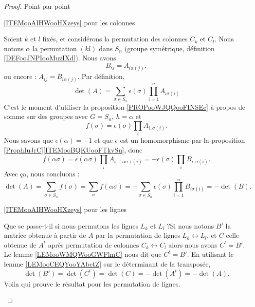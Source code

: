 \begin{proof}
    Point par point
    \begin{subproof}
    \item[\ref{ITEMooAIHWooHXzeys} pour les colonnes]

    Soient \( k\) et \( l\) fixés, et considérons la permutation des colonnes \( C_k\) et \( C_l\). Nous notons \( \alpha\) la permutation \( (kl)\) dans \( S_n\) (groupe symétrique, définition \ref{DEFooJNPIooMuzIXd}). Nous avons
    \begin{equation}
        B_{ij}=A_{i \alpha(j)},
    \end{equation}
    ou encore : \( A_{ij}=B_{i\alpha(j)}\). Par définition,
    \begin{equation}
        \det(A)=\sum_{\sigma\in S_{n}}\epsilon(\sigma)\prod_{i=1}^nA_{i\sigma(i)}
    \end{equation}
    C'est le moment d'utiliser la proposition \ref{PROPooWJQQooFINSEc} à propos de somme sur des groupes avec \( G=S_n\), \( h=\alpha\) et 
    \begin{equation}
        f(\sigma)=\epsilon(\sigma)\prod_iA_{i,\sigma(i)}.
    \end{equation}
    Nous savons que \( \epsilon(\alpha)=-1\) et que \( \epsilon\) est un homomorphisme par la proposition \ref{ProphIuJrC}\ref{ITEMooBQKUooFTkvSu}, donc
    \begin{equation}
        f(\alpha \sigma)=\epsilon(\alpha\sigma)\prod_iA_{i,(\alpha\sigma)(i)}=-\epsilon(\sigma)\prod_iB_{i,\sigma(i)}.
    \end{equation}
    Avec ça, nous concluons :
    \begin{equation}
        \det(A)=\sum_{\sigma\in S_n}f(\sigma)=\sum_{\sigma}f(\alpha \sigma)=-\sum_{\sigma\in S_n}\epsilon(\sigma)\prod_{i=1}^nB_{i\sigma(i)}=-\det(B).
    \end{equation}
    \item[\ref{ITEMooAIHWooHXzeys} pour les lignes]

    Que se passe-t-il si nous permutons les lignes \( L_k\) et \( L_{l}\) ?Si nous notons \( B'\) la matrice obtenue à partir de \( A\) par la permutation de lignes \( L_k\leftrightarrow L_l\), et \( C\) celle obtenue de \( A^t\) après permutation de colonnes \( C_k\leftrightarrow C_l\) alors nous avons \( C^t=B'\). Le lemme \ref{LEMooWMQWooGWFlmC} nous dit que \( C^t=B'\). En utilisant le lemme \ref{LEMooCEQYooYAbctZ} sur le déterminant de la transposée,
    \begin{equation}
        \det(B')=\det(C^t)=\det(C)=-\det(A^t)=-\det(A).
    \end{equation}
    Voila qui prouve le résultat pour les permutation de lignes.
        

\end{subproof}
\end{proof}

